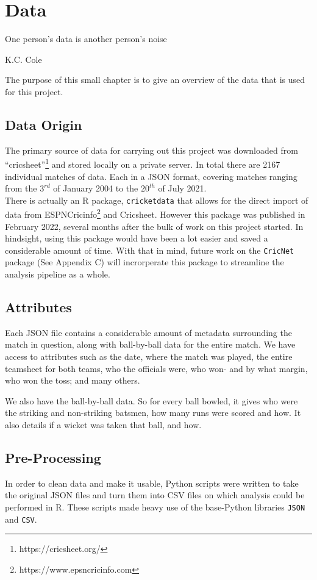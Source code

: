 \chapter{Data}

\epigraph{One person's data is another person's noise}{K.C. Cole}

The purpose of this small chapter is to give an overview of the data that is used for this project.

\section{Data Origin}
The primary source of data for carrying out this project was downloaded from ``cricsheet''\footnote{https://cricsheet.org/}
and stored locally on a private server. In total there are 2167 individual matches of data. Each in a JSON format, 
covering matches ranging from the $3^{rd}$ of January 2004 to the $20^{th}$ of July 2021. \\

There is actually an R package, \verb|cricketdata| that allows for the direct import of data from ESPNCricinfo\footnote{https://www.epsncricinfo.com}
and Cricsheet. However this package was published in February 2022, several months after the bulk of work on this project started. In hindsight, using this package 
would have been a lot easier and saved a considerable amount of time. With that in mind, future work on the \verb|CricNet| package (See Appendix C)
will incrorperate this package to streamline the analysis pipeline as a whole. 

\section{Attributes}
Each JSON file contains a considerable amount of metadata surrounding the match in question, along with 
ball-by-ball data for the entire match. We have access to attributes such as the date, where the match was played,
the entire teamsheet for both teams, who the officials were, who won- and by what margin, who won the toss; and many others.

We also have the ball-by-ball data. So for every ball bowled, it gives who were the striking and non-striking batsmen, how many runs
were scored and how. It also details if a wicket was taken that ball, and how.

\section{Pre-Processing}
In order to clean data and make it usable, Python scripts were written to take the original JSON files and turn them into CSV files on which analysis could 
be performed in R. These scripts made heavy use of the base-Python libraries \verb|JSON| and \verb|CSV|.

